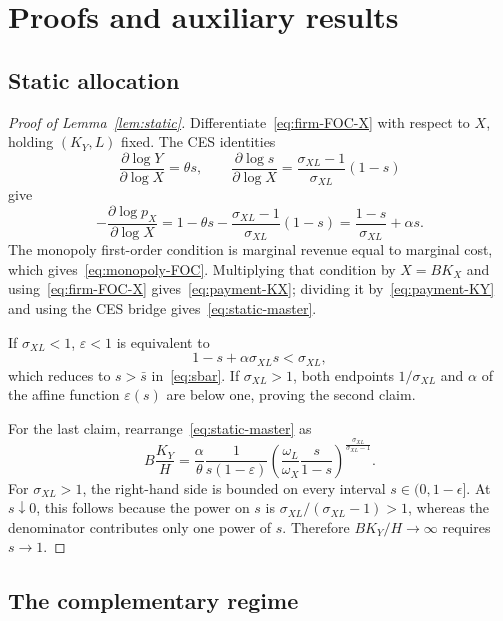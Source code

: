 \section{Proofs and auxiliary results}
\label{app:proofs}

\subsection{Static allocation}

\begin{proof}[Proof of Lemma~\ref{lem:static}]
Differentiate~\eqref{eq:firm-FOC-X} with respect to $X$, holding $(K_Y,L)$ fixed. The CES identities
\[
 \frac{\partial\log Y}{\partial\log X}=\theta s,
 \qquad
 \frac{\partial\log s}{\partial\log X}
 =\frac{\sigma_{XL}-1}{\sigma_{XL}}(1-s)
\]
give
\[
 -\frac{\partial\log p_X}{\partial\log X}
 =1-\theta s
 -\frac{\sigma_{XL}-1}{\sigma_{XL}}(1-s)
 =\frac{1-s}{\sigma_{XL}}+\alpha s.
\]
The monopoly first-order condition is marginal revenue equal to marginal cost, which gives~\eqref{eq:monopoly-FOC}. Multiplying that condition by $X=BK_X$ and using~\eqref{eq:firm-FOC-X} gives~\eqref{eq:payment-KX}; dividing it by~\eqref{eq:payment-KY} and using the CES bridge gives~\eqref{eq:static-master}.

If $\sigma_{XL}<1$, $\varepsilon<1$ is equivalent to
\[
 1-s+\alpha\sigma_{XL}s<\sigma_{XL},
\]
which reduces to $s>\bar s$ in~\eqref{eq:sbar}. If $\sigma_{XL}>1$, both endpoints $1/\sigma_{XL}$ and $\alpha$ of the affine function $\varepsilon(s)$ are below one, proving the second claim.

For the last claim, rearrange~\eqref{eq:static-master} as
\[
 B\frac{K_Y}{H}
 =\frac{\alpha}{\theta}
 \frac{1}{s(1-\varepsilon)}
 \left(\frac{\omega_L}{\omega_X}
 \frac{s}{1-s}\right)^{
 \frac{\sigma_{XL}}{\sigma_{XL}-1}}.
\]
For $\sigma_{XL}>1$, the right-hand side is bounded on every interval $s\in(0,1-\epsilon]$. At $s\downarrow0$, this follows because the power on $s$ is $\sigma_{XL}/(\sigma_{XL}-1)>1$, whereas the denominator contributes only one power of $s$. Therefore $BK_Y/H\to\infty$ requires $s\to1$.
\end{proof}

\subsection{The complementary regime}

